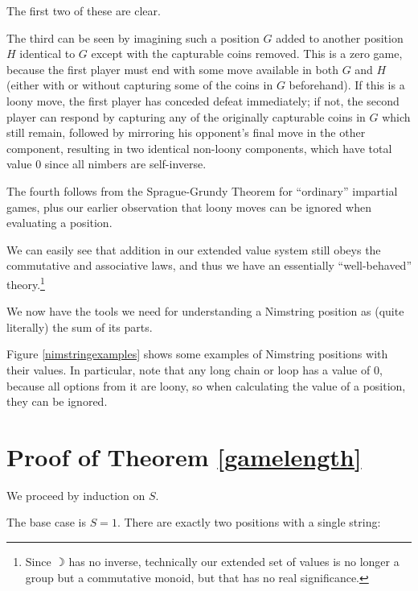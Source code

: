 \documentclass[a4paper,twocolumn]{article}
\newcommand{\loony}{\rightmoon}
\begin{document}
The first two of these are clear.

The third can be seen by imagining such a position $G$ added to
another position $H$ identical to $G$ except with the capturable coins
removed. This is a zero game, because the first player must end with
some move available in both $G$ and $H$ (either with or without
capturing some of the coins in $G$ beforehand). If this is a loony
move, the first player has conceded defeat immediately; if not, the
second player can respond by capturing any of the originally
capturable coins in $G$ which still remain, followed by mirroring his
opponent's final move in the other component, resulting in two
identical non-loony components, which have total value $0$ since all
nimbers are self-inverse.

The fourth follows from the Sprague-Grundy Theorem for ``ordinary''
impartial games, plus our earlier observation that loony moves can be
ignored when evaluating a position.

We can easily see that addition in our extended value system still
obeys the commutative and associative laws, and thus we have an
essentially ``well-behaved'' theory.\footnote{Since $\loony$ has no
  inverse, technically our extended set of values is no longer a group
  but a commutative monoid, but that has no real significance.}

We now have the tools we need for understanding a Nimstring position
as (quite literally) the sum of its parts.

Figure \ref{nimstringexamples} shows some examples of Nimstring
positions with their values. In particular, note that any long chain
or loop has a value of $0$, because all options from it are loony, so
when calculating the value of a position, they can be ignored.

\begin{figure*}
  \centering
  \def\svgscale{0.7}
  
  \caption{Examples of simple Nimstring values}
  \label{nimstringexamples}
\end{figure*}

\appendix

\section{Proof of Theorem \ref{gamelength}}\label{gamelengthproof}

We proceed by induction on $S$.

The base case is $S=1$. There are exactly two positions with a
single string:
\end{document}
